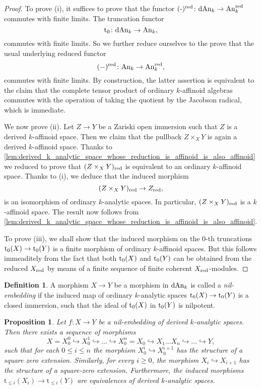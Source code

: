 \documentclass[10pt,a4paper,reqno]{amsart} %
\theoremstyle{plain}
\newtheorem{prop}[thm]{Proposition}
\theoremstyle{definition}
\newtheorem{defin}[thm]{Definition}
\theoremstyle{remark}
\numberwithin{equation}{section}
\begin{document}
\begin{proof} To prove (i), it suffices to prove that
    the functor $(\textrm{-})^{\mathrm{red}} \colon \mathrm{dAn}_k \to \mathrm{An}_k^{\mathrm{red}}$ commutes with finite limits. The truncation functor
        \[
            \mathrm{t}_0 \colon \mathrm{dAn}_k \to \mathrm{An}_k,  
        \]
    commutes with finite limits. So we further reduce ourselves to the prove that the usual underlying reduced functor
        \[
            (-)^{\mathrm{red}} \colon \mathrm{An}_k \to \mathrm{An}_k^{\mathrm{red}},
        \]
    commutes with finite limits. By construction,
    the latter assertion is equivalent to the claim that
    the complete tensor product of ordinary $k$-affinoid algebras commutes with the operation of taking the quotient by the Jacobson radical, which is immediate.

    We now prove (ii). Let $Z \to Y$ be a Zariski open immersion such that $Z$ is a derived $k$-affinoid space. Then we claim that the pullback
    $Z \times_X Y$ is again a derived $k$-affinoid space. Thanks to \cref{lem:derived_k_analytic_space_whose_reduction_is_affinoid_is_also_affinoid}
    we reduced to prove that $(Z \times_X Y)_{\mathrm{red}}$ is equivalent to an
    ordinary $k$-affinoid space. Thanks to (i), we deduce that the induced morphism
        \[
            (Z \times_X Y)_{\mathrm{red}} \to Z_{\mathrm{red}},  
        \]
    is an isomorphism of ordinary $k$-analytic spaces. In particular, $(Z \times_X Y)_{\mathrm{red}}$ is a $k$-affinoid space. The result now follows from
    \cref{lem:derived_k_analytic_space_whose_reduction_is_affinoid_is_also_affinoid}.

    To prove (iii), we shall show that the induced morphism on the $0$-th truncations $\mathrm{t}_0(X) \to \mathrm{t}_0(Y)$ is a finite morphism of ordinary $k$-affinoid spaces.
    But this follows immeaditely from the fact that both $\mathrm{t}_0(X)$ and $\mathrm{t}_0(Y)$ can be obtained from the reduced $X_{\mathrm{red}}$ by means of a finite sequence of finite
    coherent $X_{\mathrm{red}}$-modules.
\end{proof}


\begin{defin}
    A morphism $X \to Y$ be a morphism in $\mathrm{dAn}_k$ is called a \emph{nil-embedding} if the induced map of ordinary $k$-analytic spaces
    $\mathrm{t}_0(X) \to \mathrm{t}_0(Y)$ is a closed immersion, such that the ideal of $\mathrm{t}_0(X)$ in $\mathrm{t}_0(Y)$ is nilpotent. 
\end{defin}

\begin{prop} \label{prop:filtered_colimit_for_nil-embeddings}
    Let $f \colon X \to Y$ be a nil-embedding of derived $k$-analytic spaces. Then there exists a sequence of morphisms
        \[X = X_0^0 \hookrightarrow X_0^1 \hookrightarrow \dots \hookrightarrow X_0^n = X_0 
        \hookrightarrow X_1 \dots X_n \hookrightarrow \dots \hookrightarrow Y,\]
    such that for each $0 \le i \le n$ the morphism $X_0^i \hookrightarrow X_0^{i+1}$ has the structure of a square zero extension.
    Similarly, for every $i \ge 0$, the morphism $X_i \hookrightarrow X_{i+1}$ has the structure of a square-zero extension.
    Furthermore, the induced morphisms $\mathrm{t}_{\le i}(X_i) \to \mathrm{t}_{\le i}(Y)$ are equivalences of derived
    $k$-analytic spaces.
\end{prop}
\end{document}
